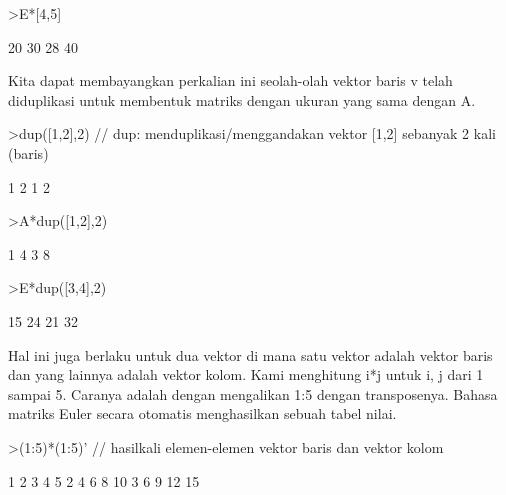 \documentclass[a4paper,10pt]{article}
\begin{document}
\begin{eulernotebook}
\begin{eulercomment}
\begin{eulercomment}
\begin{eulercomment}
\begin{eulercomment}
\begin{euleroutput}
\end{euleroutput}
\begin{eulerprompt}
>E*[4,5]
\end{eulerprompt}
\begin{euleroutput}
                       20                      30 
                       28                      40 
\end{euleroutput}
\begin{eulercomment}
Kita dapat membayangkan perkalian ini seolah-olah vektor baris v telah
diduplikasi untuk membentuk matriks dengan ukuran yang sama dengan A.
\end{eulercomment}
\begin{eulerprompt}
>dup([1,2],2) // dup: menduplikasi/menggandakan vektor [1,2] sebanyak 2 kali (baris)
\end{eulerprompt}
\begin{euleroutput}
              1             2 
              1             2 
\end{euleroutput}
\begin{eulerprompt}
>A*dup([1,2],2) 
\end{eulerprompt}
\begin{euleroutput}
                        1                       4 
                        3                       8 
\end{euleroutput}
\begin{eulerprompt}
>E*dup([3,4],2)
\end{eulerprompt}
\begin{euleroutput}
                       15                      24 
                       21                      32 
\end{euleroutput}
\begin{eulercomment}
Hal ini juga berlaku untuk dua vektor di mana satu vektor adalah
vektor baris dan yang lainnya adalah vektor kolom. Kami menghitung i*j
untuk i, j dari 1 sampai 5. Caranya adalah dengan mengalikan 1:5
dengan transposenya. Bahasa matriks Euler secara otomatis menghasilkan
sebuah tabel nilai.
\end{eulercomment}
\begin{eulerprompt}
>(1:5)*(1:5)' // hasilkali elemen-elemen vektor baris dan vektor kolom
\end{eulerprompt}
\begin{euleroutput}
              1             2             3             4             5 
              2             4             6             8            10 
              3             6             9            12            15 

\end{euleroutput}
\end{eulercomment}
\end{eulercomment}
\end{eulercomment}
\end{eulercomment}
\end{eulernotebook}
\end{document}

